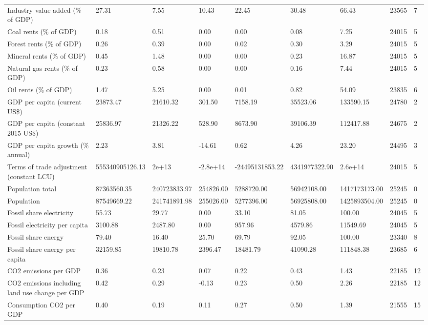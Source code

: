 \begin{longtable}{lllllllll}
Industry value added (\% of GDP) & 27.31 & 7.55 & 10.43 & 22.45 & 30.48 & 66.43 & 23565 & 7\\
Coal rents (\% of GDP) & 0.18 & 0.51 & 0.00 & 0.00 & 0.08 & 7.25 & 24015 & 5\\
Forest rents (\% of GDP) & 0.26 & 0.39 & 0.00 & 0.02 & 0.30 & 3.29 & 24015 & 5\\
Mineral rents (\% of GDP) & 0.45 & 1.48 & 0.00 & 0.00 & 0.23 & 16.87 & 24015 & 5\\
\addlinespace
Natural gas rents (\% of GDP) & 0.23 & 0.58 & 0.00 & 0.00 & 0.16 & 7.44 & 24015 & 5\\
Oil rents (\% of GDP) & 1.47 & 5.25 & 0.00 & 0.01 & 0.82 & 54.09 & 23835 & 6\\
GDP per capita (current US\$) & 23873.47 & 21610.32 & 301.50 & 7158.19 & 35523.06 & 133590.15 & 24780 & 2\\
GDP per capita (constant 2015 US\$) & 25836.97 & 21326.22 & 528.90 & 8673.90 & 39106.39 & 112417.88 & 24675 & 2\\
GDP per capita growth (\% annual) & 2.23 & 3.81 & -14.61 & 0.62 & 4.26 & 23.20 & 24495 & 3\\
\addlinespace
Terms of trade adjustment (constant LCU) & 555340905126.13 & 2e+13 & -2.8e+14 & -24495131853.22 & 4341977322.90 & 2.6e+14 & 24015 & 5\\
Population total & 87363560.35 & 240723833.97 & 254826.00 & 5288720.00 & 56942108.00 & 1417173173.00 & 25245 & 0\\
Population & 87549669.22 & 241741891.98 & 255026.00 & 5277396.00 & 56925808.00 & 1425893504.00 & 25245 & 0\\
Fossil share electricity & 55.73 & 29.77 & 0.00 & 33.10 & 81.05 & 100.00 & 24045 & 5\\
Fossil electricity per capita & 3100.88 & 2487.80 & 0.00 & 957.96 & 4579.86 & 11549.69 & 24045 & 5\\
\addlinespace
Fossil share energy & 79.40 & 16.40 & 25.70 & 69.79 & 92.05 & 100.00 & 23340 & 8\\
Fossil share energy per capita & 32159.85 & 19810.78 & 2396.47 & 18481.79 & 41090.28 & 111848.38 & 23685 & 6\\
CO2 emissions per GDP & 0.36 & 0.23 & 0.07 & 0.22 & 0.43 & 1.43 & 22185 & 12\\
CO2 emissions including land use change per GDP & 0.42 & 0.29 & -0.13 & 0.23 & 0.50 & 2.26 & 22185 & 12\\
Consumption CO2 per GDP & 0.40 & 0.19 & 0.11 & 0.27 & 0.50 & 1.39 & 21555 & 15\\

\end{longtable}
